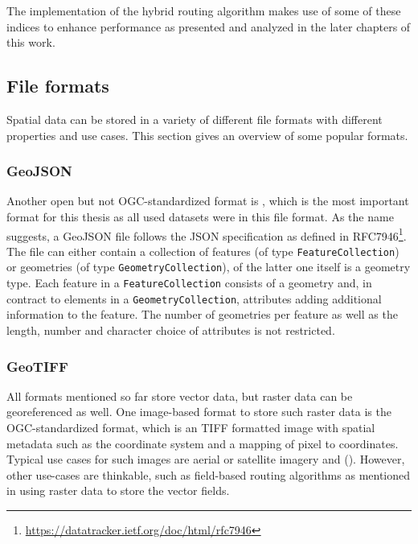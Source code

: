 			The implementation of the hybrid routing algorithm makes use of some of these indices to enhance performance as presented and analyzed in the later chapters of this work.
			
	\subsection{File formats}
	\label{subsec:file-formats}
	
		Spatial data can be stored in a variety of different file formats with different properties and use cases.
		This section gives an overview of some popular formats.
		
		\subsubsection{GeoJSON}
		\label{subsubsec:geojson}
		
			Another open but not OGC-standardized format is , which is the most important format for this thesis as all used datasets were in this file format.
			As the name suggests, a GeoJSON file follows the JSON specification as defined in RFC7946\footnote{\url{https://datatracker.ietf.org/doc/html/rfc7946}}.
			The file can either contain a collection of features (of type \texttt{FeatureCollection}) or geometries (of type \texttt{GeometryCollection}), of the latter one itself is a geometry type.
			Each feature in a \texttt{FeatureCollection} consists of a geometry and, in contract to elements in a \texttt{GeometryCollection}, attributes adding additional information to the feature.
			The number of geometries per feature as well as the length, number and character choice of attributes is not restricted.
			
		\subsubsection{GeoTIFF}
		\label{subsubsec:geotiff-format}
		
			All formats mentioned so far store vector data, but raster data can be georeferenced as well.
			One image-based format to store such raster data is the OGC-standardized  format\cite{ogc-geotiff}, which is an TIFF formatted image with spatial metadata such as the coordinate system and a mapping of pixel to coordinates.
			Typical use cases for such images are aerial or satellite imagery and  ().
			However, other use-cases are thinkable, such as field-based routing algorithms as mentioned in  using raster data to store the vector fields.
		
